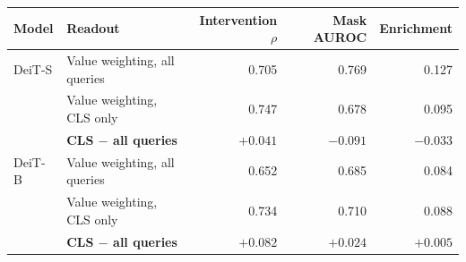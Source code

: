\begin{tabular}{@{}llrrr@{}}
\toprule
Model & Readout & Intervention $\rho$ & Mask AUROC & Enrichment \\
\midrule
DeiT-S & Value weighting, all queries & 0.705 & 0.769 & 0.127 \\
 & Value weighting, CLS only & 0.747 & 0.678 & 0.095 \\
 & \textbf{CLS $-$ all queries} & {\boldmath$+0.041$} & {\boldmath$-0.091$} & {\boldmath$-0.033$} \\
DeiT-B & Value weighting, all queries & 0.652 & 0.685 & 0.084 \\
 & Value weighting, CLS only & 0.734 & 0.710 & 0.088 \\
 & \textbf{CLS $-$ all queries} & {\boldmath$+0.082$} & {\boldmath$+0.024$} & {\boldmath$+0.005$} \\
\bottomrule
\end{tabular}
